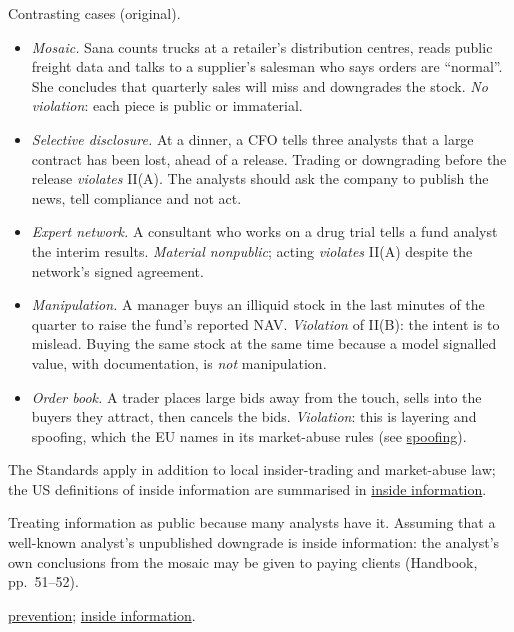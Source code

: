 \begin{qfrule}
 Contrasting cases (original).
\begin{itemize}
\item \emph{Mosaic.} Sana counts trucks at a retailer's distribution centres, reads public freight data and talks to a supplier's salesman who says orders are ``normal''. She concludes that quarterly sales will miss and downgrades the stock. \emph{No violation}: each piece is public or immaterial.
\item \emph{Selective disclosure.} At a dinner, a CFO tells three analysts that a large contract has been lost, ahead of a release. Trading or downgrading before the release \emph{violates} II(A). The analysts should ask the company to publish the news, tell compliance and not act.
\item \emph{Expert network.} A consultant who works on a drug trial tells a fund analyst the interim results. \emph{Material nonpublic}; acting \emph{violates} II(A) despite the network's signed agreement.
\item \emph{Manipulation.} A manager buys an illiquid stock in the last minutes of the quarter to raise the fund's reported NAV. \emph{Violation} of II(B): the intent is to mislead. Buying the same stock at the same time because a model signalled value, with documentation, is \emph{not} manipulation.
\item \emph{Order book.} A trader places large bids away from the touch, sells into the buyers they attract, then cancels the bids. \emph{Violation}: this is layering and spoofing, which the EU names in its market-abuse rules (see \hyperref[rule:spoofing-securities-markets]{spoofing}).
\end{itemize}

 The Standards apply in addition to local insider-trading and market-abuse law; the US definitions of inside information are summarised in \hyperref[def:inside-information]{inside information}.

 Treating information as public because many analysts have it. Assuming that a well-known analyst's unpublished downgrade is inside information: the analyst's own conclusions from the mosaic may be given to paying clients (Handbook, pp.~51--52).

 \hyperref[meth:preventing-market-integrity-violations]{prevention}; \hyperref[def:inside-information]{inside information}.

\end{qfrule}

